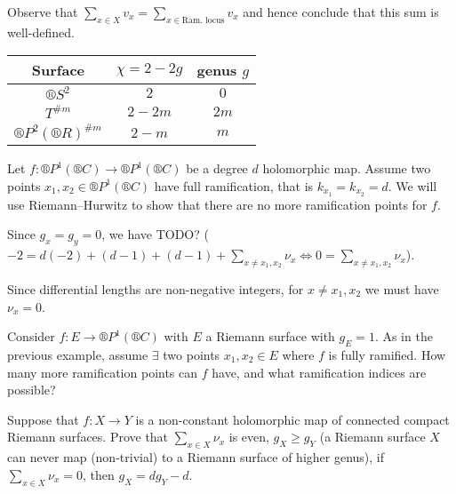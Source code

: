 \documentclass[12pt]{article}					%
\begin{document}
\begin{priklad}
	Observe that $\sum_{x \in X} v_x = \sum_{x \in \text{Ram. locus}} v_x$ and hence conclude that this sum is well-defined.
\end{priklad}


\begin{poznamka}
	\begin{tabular}{c|c|c}
		Surface           & $χ = 2 - 2g$   & genus $g$ \\ \hline
		$®S^2$            & $2$            & $0$       \\
		$T^{\# m}$        & $2 - 2m$       & $2m$      \\
		$®P^2(®R)^{\# m}$ & $2 - m$        & $m$        
	\end{tabular}	
\end{poznamka}

\begin{priklad}
	Let $f: ®P^1(®C) \rightarrow ®P^1(®C)$ be a degree $d$ holomorphic map. Assume two points $x_1, x_2 \in ®P^1(®C)$ have full ramification, that is $k_{x_1} = k_{x_2} = d$. We will use Riemann–Hurwitz to show that there are no more ramification points for $f$.
	
	\begin{reseni}
		Since $g_x = g_y = 0$, we have TODO? ($-2 = d(-2) + (d - 1) + (d - 1) + \sum_{x ≠ x_1, x_2} ν_x \Leftrightarrow 0 = \sum_{x ≠ x_1, x_2} ν_x$).

		Since differential lengths are non-negative integers, for $x ≠ x_1, x_2$ we must have $ν_{x} = 0$.
	\end{reseni}
\end{priklad}

\begin{priklad}
	Consider $f: E \rightarrow ®P^1(®C)$ with $E$ a Riemann surface with $g_E = 1$. As in the previous example, assume $\exists$ two points $x_1, x_2 \in E$ where $f$ is fully ramified. How many more ramification points can $f$ have, and what ramification indices are possible?
\end{priklad}

\begin{priklad}
	Suppose that $f: X \rightarrow Y$ is a non-constant holomorphic map of connected compact Riemann surfaces. Prove that $\sum_{x \in X} ν_x$ is even, $g_X ≥ g_Y$ (a Riemann surface $X$ can never map (non-trivial) to a Riemann surface of higher genus), if $\sum_{x \in X} ν_x = 0$, then $g_X = dg_Y - d$.
\end{priklad}
\end{document}
